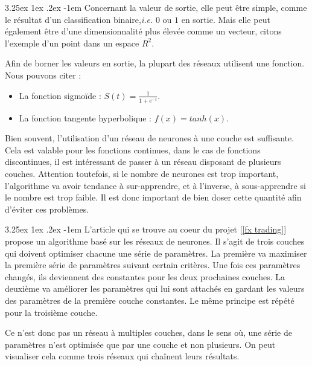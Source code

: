 \documentclass[a4paper, 11pt]{article}
\makeatletter
\renewcommand\paragraph{\@startsection{paragraph}{5}{\z@}%
  {3.25ex \@plus1ex \@minus.2ex}%
  {-1em}%
  {\normalfont\normalsize\bfseries}}
\makeatother
\begin{document}

\paragraph{}
Concernant la valeur de sortie, elle peut être simple, comme le résultat d'un classification binaire,\textit{i.e.} $0$ ou $1$ en sortie. Mais elle peut également être d'une dimensionnalité plus élevée comme un vecteur, citons l'exemple d'un point dans un espace $R^2$.

Afin de borner les valeurs en sortie, la plupart des réseaux utilisent une fonction. Nous pouvons citer :
\begin{itemize}
\item La fonction sigmoïde : $S(t) = \frac{1}{1 + e^{-t}}$.
\item La fonction tangente hyperbolique : $f(x) = tanh(x)$.
\end{itemize}

Bien souvent, l'utilisation d'un réseau de neurones à une couche est suffisante. Cela est valable pour les fonctions continues, dans le cas de fonctions discontinues, il est intéressant de passer à un réseau disposant de plusieurs couches. Attention toutefois, si le nombre de neurones est trop important, l'algorithme va avoir tendance à sur-apprendre, et à l'inverse, à sous-apprendre si le nombre est trop faible. Il est donc important de bien doser cette quantité afin d'éviter ces problèmes.

\paragraph{}
L'article qui se trouve au coeur du projet [\ref{fx trading}] propose un algorithme basé sur les réseaux de neurones. Il s'agit de trois couches qui doivent optimiser chacune une série de paramètres. La première va maximiser la première série de paramètres suivant certain critères. Une fois ces paramètres changés, ils deviennent des constantes pour les deux prochaines couches. La deuxième va améliorer les paramètres qui lui sont attachés en gardant les valeurs des paramètres de la première couche constantes. Le même principe est répété pour la troisième couche.

Ce n'est donc pas un réseau à multiples couches, dans le sens où, une série de paramètres n'est optimisée que par une couche et non plusieurs. On peut visualiser cela comme trois réseaux qui chaînent leurs résultats.
\end{document}
